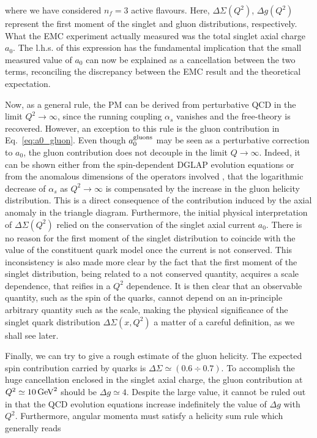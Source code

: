 where we have considered $n_f = 3$ active flavours. Here, $\Delta \Sigma(Q^2)$, $\Delta g(Q^2)$ represent the first moment of the singlet and gluon distributions, respectively. What the EMC experiment actually measured was the total singlet axial charge $a_0$. The l.h.s. of this expression has the fundamental implication that the small measured value of $a_0$ can now be explained as a cancellation between the two terms, reconciling the discrepancy between the EMC result and the theoretical expectation.\par Now, as a general rule, the PM can be derived from perturbative QCD in the limit $Q^2 \rightarrow \infty$, since the running coupling $\alpha_s$ vanishes and the free-theory is recovered. However, an exception to this rule is the gluon contribution in Eq.~\eqref{eq:a0_gluon}. Even though $a_{0}^{\textrm{gluons}}$ may be seen as a perturbative correction to $a_0$, the gluon contribution does not decouple in the limit $Q \rightarrow \infty$. Indeed, it can be shown either from the spin-dependent DGLAP evolution equations \cite{Borah:2012ey} or from the anomalous dimensions of the operators involved \cite{Anselmino:1994gn}, that the logarithmic decrease of $\alpha_s$ as $Q^2 \rightarrow \infty$ is compensated by the increase in the gluon helicity distribution. This is a direct consequence of the contribution induced by the axial anomaly in the triangle diagram. Furthermore, the initial physical interpretation of $\Delta \Sigma (Q^2)$ relied on the conservation of the singlet axial current $a_0$. There is no reason for the first moment of the singlet distribution to coincide with the value of the constituent quark model once the current is not conserved. This inconsistency is also made more clear by the fact that the first moment of the singlet distribution, being related to a not conserved quantity, acquires a scale dependence, that reifies in a $Q^2$ dependence. It is then clear that an observable quantity, such as the spin of the quarks, cannot depend on an in-principle arbitrary quantity such as the scale, making the physical significance of the singlet quark distribution $\Delta \Sigma(x,Q^2)$ a matter of a careful definition, as we shall see later.\par
Finally, we can try to give a rough estimate of the gluon helicity. The expected spin contribution carried by quarks is $\Delta \Sigma \simeq (0.6  \div 0.7)$. To accomplish the huge cancellation enclosed in the singlet axial charge, the gluon contribution at $Q^2 \simeq 10 \, \textrm{GeV}^2$ should be $\Delta g \simeq 4$. Despite the large value, it cannot be ruled out in that the QCD evolution equations increase indefinitely the value of $\Delta g$ with $Q^2$. Furthermore, angular momenta must satisfy a helicity sum rule which generally reads
